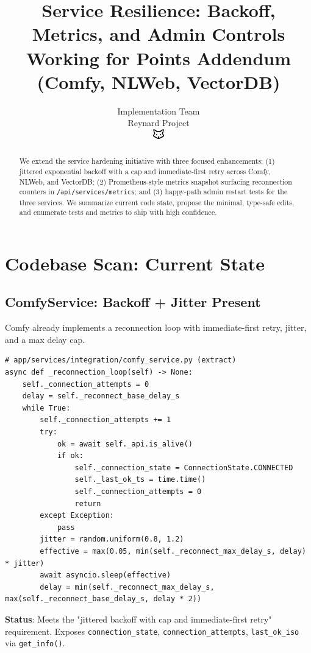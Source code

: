 \documentclass[11pt]{article}
\title{\textbf{Service Resilience: Backoff, Metrics, and Admin Controls}\\
\Large Working for Points Addendum (Comfy, NLWeb, VectorDB)}
\author{Implementation Team\\Reynard Project\\\includegraphics[width=0.5cm]{../../shared-assets/favicon.pdf}}
\begin{document}
\maketitle

\begin{abstract}
We extend the service hardening initiative with three focused enhancements: (1) jittered exponential backoff with a cap and immediate-first retry across Comfy, NLWeb, and VectorDB; (2) Prometheus-style metrics snapshot surfacing reconnection counters in \texttt{/api/services/metrics}; and (3) happy-path admin restart tests for the three services. We summarize current code state, propose the minimal, type-safe edits, and enumerate tests and metrics to ship with high confidence.
\end{abstract}

\tableofcontents
\newpage

\section{Codebase Scan: Current State}

\subsection{ComfyService: Backoff + Jitter Present}
Comfy already implements a reconnection loop with immediate-first retry, jitter, and a max delay cap.

\begin{verbatim}
# app/services/integration/comfy_service.py (extract)
async def _reconnection_loop(self) -> None:
    self._connection_attempts = 0
    delay = self._reconnect_base_delay_s
    while True:
        self._connection_attempts += 1
        try:
            ok = await self._api.is_alive()
            if ok:
                self._connection_state = ConnectionState.CONNECTED
                self._last_ok_ts = time.time()
                self._connection_attempts = 0
                return
        except Exception:
            pass
        jitter = random.uniform(0.8, 1.2)
        effective = max(0.05, min(self._reconnect_max_delay_s, delay) * jitter)
        await asyncio.sleep(effective)
        delay = min(self._reconnect_max_delay_s, max(self._reconnect_base_delay_s, delay * 2))
\end{verbatim}

\textbf{Status}: Meets the "jittered backoff with cap and immediate-first retry" requirement. Exposes \texttt{connection\_state}, \texttt{connection\_attempts}, \texttt{last\_ok\_iso} via \texttt{get\_info()}.
\end{document}
